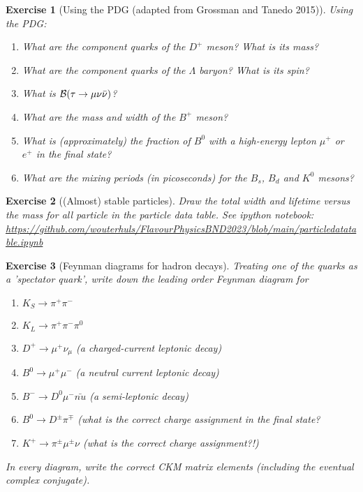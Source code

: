 \documentclass{article}
\newcommand{\nbexercise}[1]{\url{https://github.com/wouterhuls/FlavourPhysicsBND2023/blob/main/#1}}
\newtheorem{homeworkexercise}{Exercise}
\newenvironment{enumexercise}{
  \renewcommand{\labelenumi}{\bfseries{(\alph{enumi})}}
  \leavevmode\begin{enumerate}}{\end{enumerate}\vspace{5pt}}
\newcommand{\Br}[1]{{\cal B}(#1)}
\begin{document}
\begin{homeworkexercise}[Using the PDG (adapted from Grossman and Tanedo 2015)]  
  Using the PDG:
  \begin{enumexercise}
  \item What are the component quarks of the $D^+$ meson? What is its mass? 
  \item What are the component quarks of the $\Lambda$ baryon? What is its spin?
  \item What is $\Br{\tau \to \mu \nu \bar{\nu}}$?
  \item What are the mass and width of the $B^+$ meson?
  \item What is (approximately) the fraction of $B^0$ with a high-energy lepton $\mu^+$ or $e^+$ in the final state?
  \item What are the mixing periods (in picoseconds) for the $B_s$, $B_d$ and $K^0$ mesons?
  \end{enumexercise}
\end{homeworkexercise}

\begin{homeworkexercise}[(Almost) stable particles]
  Draw the total width and lifetime versus the mass for all particle in the particle data table. See ipython notebook:
  \nbexercise{particledatatable.ipynb}
\end{homeworkexercise} 

\begin{homeworkexercise}[Feynman diagrams for hadron decays]
  Treating one of the quarks as a 'spectator quark', write down the leading order Feynman diagram for
  \begin{enumexercise}
  \item $K_S \to \pi^+ \pi^-$
  \item $K_L \to \pi^+ \pi^- \pi^0$
  \item $D^+ \to \mu^+ \nu_\mu$ (a charged-current leptonic decay)
  \item $B^0 \to \mu^+ \mu^-$ (a neutral current leptonic decay)
  \item $B^- \to D^0 \mu^- \bar{nu}$ (a semi-leptonic decay)
  \item $B^0 \to D^\pm \pi^\mp$ (what is the correct charge assignment in the final state?
  \item $K^+ \to \pi^\pm \mu^\pm \nu$ (what is the correct charge assignment?!) 
  \end{enumexercise}
  In every diagram, write the correct CKM matrix elements (including the eventual complex conjugate).
\end{homeworkexercise}
\end{document}
